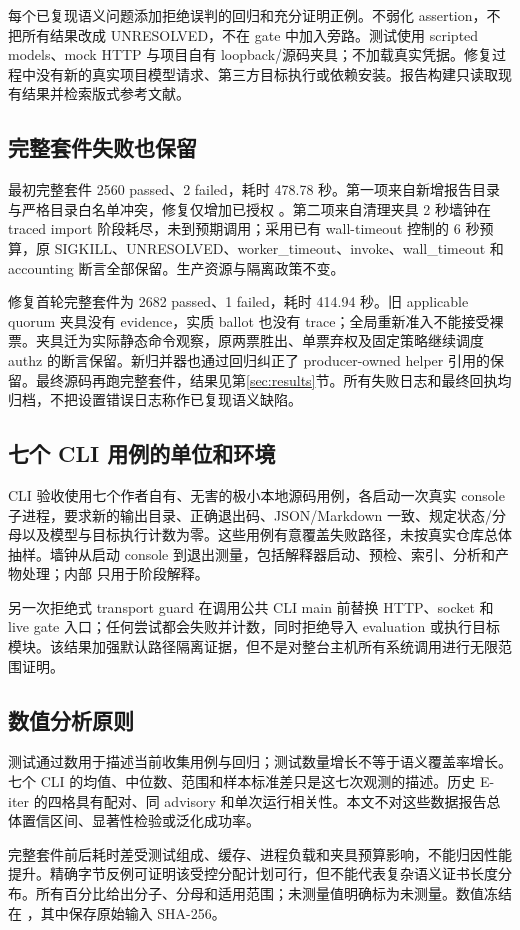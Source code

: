 每个已复现语义问题添加拒绝误判的回归和充分证明正例。不弱化 assertion，不把所有结果改成 UNRESOLVED，不在 gate 中加入旁路。测试使用 scripted models、mock HTTP 与项目自有 loopback/源码夹具；不加载真实凭据。修复过程中没有新的真实项目模型请求、第三方目标执行或依赖安装。报告构建只读取现有结果并检索版式参考文献。

\subsection{完整套件失败也保留}
最初完整套件 2560 passed、2 failed，耗时 478.78 秒。第一项来自新增报告目录与严格目录白名单冲突，修复仅增加已授权 。第二项来自清理夹具 2 秒墙钟在 traced import 阶段耗尽，未到预期调用；采用已有 wall-timeout 控制的 6 秒预算，原 SIGKILL、UNRESOLVED、worker\_timeout、invoke、wall\_timeout 和 accounting 断言全部保留。生产资源与隔离政策不变。

修复首轮完整套件为 2682 passed、1 failed，耗时 414.94 秒。旧 applicable quorum 夹具没有 evidence，实质 ballot 也没有 trace；全局重新准入不能接受裸票。夹具迁为实际静态命令观察，原两票胜出、单票弃权及固定策略继续调度 authz 的断言保留。新归并器也通过回归纠正了 producer-owned helper 引用的保留。最终源码再跑完整套件，结果见第\ref{sec:results}节。所有失败日志和最终回执均归档，不把设置错误日志称作已复现语义缺陷。\citep{verification,acceptance}

\subsection{七个 CLI 用例的单位和环境}
CLI 验收使用七个作者自有、无害的极小本地源码用例，各启动一次真实 console 子进程，要求新的输出目录、正确退出码、JSON/Markdown 一致、规定状态/分母以及模型与目标执行计数为零。这些用例有意覆盖失败路径，未按真实仓库总体抽样。墙钟从启动 console 到退出测量，包括解释器启动、预检、索引、分析和产物处理；内部  只用于阶段解释。

另一次拒绝式 transport guard 在调用公共 CLI main 前替换 HTTP、socket 和 live gate 入口；任何尝试都会失败并计数，同时拒绝导入 evaluation 或执行目标模块。该结果加强默认路径隔离证据，但不是对整台主机所有系统调用进行无限范围证明。

\subsection{数值分析原则}
测试通过数用于描述当前收集用例与回归；测试数量增长不等于语义覆盖率增长。七个 CLI 的均值、中位数、范围和样本标准差只是这七次观测的描述。历史 E-iter 的四格具有配对、同 advisory 和单次运行相关性。本文不对这些数据报告总体置信区间、显著性检验或泛化成功率。

完整套件前后耗时差受测试组成、缓存、进程负载和夹具预算影响，不能归因性能提升。精确字节反例可证明该受控分配计划可行，但不能代表复杂语义证书长度分布。所有百分比给出分子、分母和适用范围；未测量值明确标为未测量。数值冻结在 ，其中保存原始输入 SHA-256。\citep{clireceipt,transportguard}
